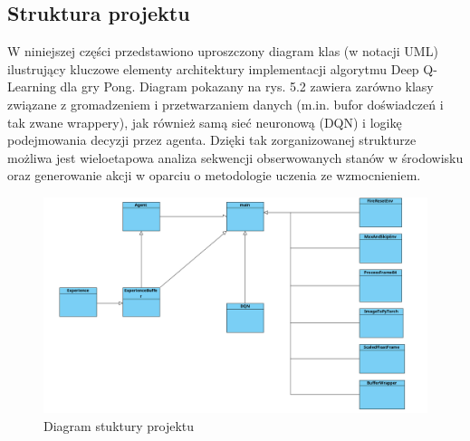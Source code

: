 \documentclass[a4paper, 12pt]{article}
\numberwithin{equation}{section}
\begin{document}
    \subsection{Struktura projektu}
    W niniejszej części przedstawiono uproszczony diagram klas (w notacji UML) ilustrujący kluczowe elementy architektury implementacji algorytmu Deep Q-Learning dla gry Pong. Diagram pokazany na rys. 5.2 zawiera zarówno klasy związane z gromadzeniem i przetwarzaniem danych (m.in. bufor doświadczeń i tak zwane wrappery), jak również samą sieć neuronową (DQN) i logikę podejmowania decyzji przez agenta. Dzięki tak zorganizowanej strukturze możliwa jest wieloetapowa analiza sekwencji obserwowanych stanów w środowisku oraz generowanie akcji w oparciu o metodologie uczenia ze wzmocnieniem.
    \begin{figure}[H]
        \centering
        \includegraphics[width=\textwidth]{pictures/DQN_diagram.png}
        \caption{Diagram stuktury projektu}
    \end{figure}
\end{document}
